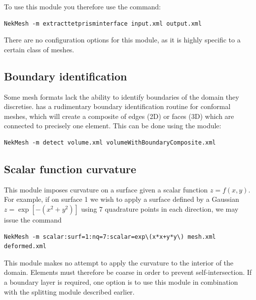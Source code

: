 To use this module you therefore use the command:

\begin{lstlisting}[style=BashInputStyle]
  NekMesh -m extracttetprisminterface input.xml output.xml
\end{lstlisting}

There are no configuration options for this module, as it is highly specific to
a certain class of meshes.

\subsection{Boundary identification}

Some mesh formats lack the ability to identify boundaries of the domain they
discretise. \mc has a rudimentary boundary identification routine for conformal
meshes, which will create a composite of edges (2D) or faces (3D) which are
connected to precisely one element. This can be done using the 
module:

\begin{lstlisting}[style=BashInputStyle]
  NekMesh -m detect volume.xml volumeWithBoundaryComposite.xml
\end{lstlisting}

\subsection{Scalar function curvature}

This module imposes curvature on a surface given a scalar function
$z=f(x,y)$. For example, if on surface 1 we wish to apply a surface defined by a
Gaussian $z = \exp[-(x^2+y^2)]$ using 7 quadrature points in each direction, we
may issue the command

\begin{lstlisting}[style=BashInputStyle]
  NekMesh -m scalar:surf=1:nq=7:scalar=exp\(x*x+y*y\) mesh.xml deformed.xml
\end{lstlisting}

\begin{notebox}
  This module makes no attempt to apply the curvature to the interior of the
  domain. Elements must therefore be coarse in order to prevent
  self-intersection. If a boundary layer is required, one option is to use this
  module in combination with the splitting module described earlier.
\end{notebox}



